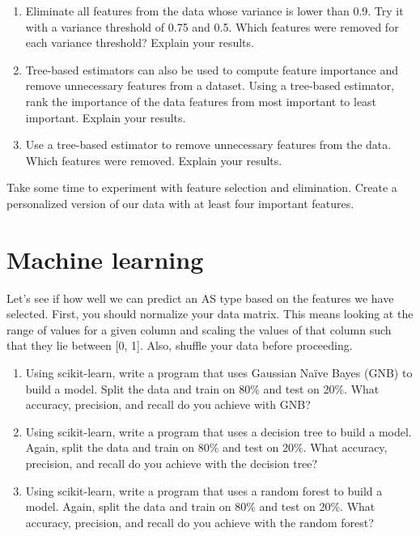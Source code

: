 \documentclass[11pt]{article}
\begin{document}
\begin{enumerate}[resume]

\item Eliminate all features from the data whose variance is lower than 0.9.  Try it with a variance threshold of 0.75 and 0.5.  Which features were removed for each variance threshold?  Explain your results.

\item Tree-based estimators can also be used to compute feature importance and remove unnecessary features from a dataset.  Using a tree-based estimator, rank the importance of the data features from most important to least important.  Explain your results.

\item Use a tree-based estimator to remove unnecessary features from the data.  Which features were removed.  Explain your results.
\end{enumerate}

\begin{flushleft}
Take some time to experiment with feature selection and elimination. Create a personalized version of our data with at least four important features.
\end{flushleft}

\section{Machine learning}
Let’s see if how well we can predict an AS type based on the features we have selected.  First, you should normalize your data matrix. This means looking at the range of values for a given column and scaling the values of that column such that they lie between [0, 1].  Also, shuffle your data before proceeding.

\begin{enumerate}[resume]
\item Using scikit-learn, write a program that uses Gaussian Naïve Bayes (GNB) to build a model.  Split the data and train on 80\% and test on 20\%.  What accuracy, precision, and recall do you achieve with GNB?

\item Using scikit-learn, write a program that uses a decision tree to build a model.  Again, split the data and train on 80\% and test on 20\%.  What accuracy, precision, and recall do you achieve with the decision tree?

\item Using scikit-learn, write a program that uses a random forest to build a model.  Again, split the data and train on 80\% and test on 20\%.  What accuracy, precision, and recall do you achieve with the random forest?
\end{enumerate}
\end{document}
